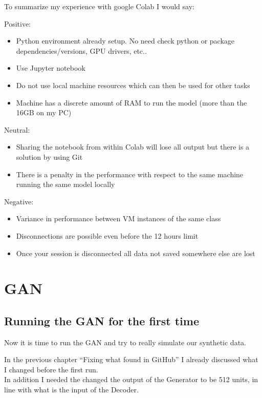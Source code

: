 \documentclass[
  letterpaper,
  DIV=11,
  numbers=noendperiod]{scrreprt}
\providecommand{\tightlist}{%
  \setlength{\itemsep}{0pt}\setlength{\parskip}{0pt}}\usepackage{longtable,booktabs,array}
\begin{document}
To summarize my experience with google Colab I would say:

Positive:

\begin{itemize}
\tightlist
\item
  Python environment already setup. No need check python or package
  dependencies/versions, GPU drivers, etc..
\item
  Use Jupyter notebook
\item
  Do not use local machine resources which can then be used for other
  tasks
\item
  Machine has a discrete amount of RAM to run the model (more than the
  16GB on my PC)
\end{itemize}

Neutral:

\begin{itemize}
\tightlist
\item
  Sharing the notebook from within Colab will lose all output but there
  is a solution by using Git
\item
  There is a penalty in the performance with respect to the same machine
  running the same model locally
\end{itemize}

Negative:

\begin{itemize}
\tightlist
\item
  Variance in performance between VM instances of the same class
\item
  Disconnections are possible even before the 12 hours limit
\item
  Once your session is disconnected all data not saved somewhere else
  are lost
\end{itemize}

\part{GAN}

\hypertarget{running-the-gan-for-the-first-time}{%
\chapter{Running the GAN for the first
time}\label{running-the-gan-for-the-first-time}}

Now it is time to run the GAN and try to really simulate our synthetic
data.

In the previous chapter ``Fixing what found in GitHub'' I already
discussed what I changed before the first run.\\
In addition I needed the changed the output of the Generator to be 512
units, in line with what is the input of the Decoder.
\end{document}
